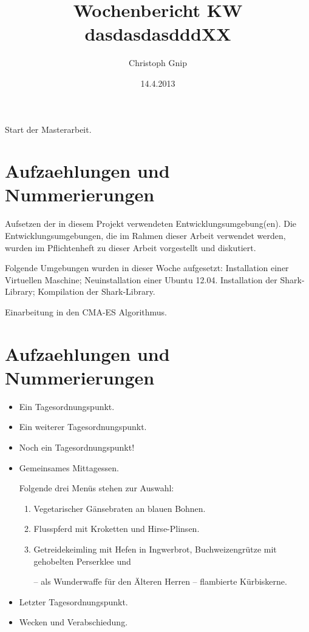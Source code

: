 ﻿\documentclass[a4paper,12pt,fleqn]{scrartcl}
\title{Wochenbericht KW dasdasdasdddXX}
\author{Christoph Gnip}
\date{14.4.2013}
\begin{document}
\maketitle

Start der Masterarbeit.

\section[Allgemeines]{Aufzaehlungen und Nummerierungen}

Aufsetzen der in diesem Projekt verwendeten Entwicklungsumgebung(en). Die
Entwicklungsumgebungen, die im Rahmen dieser Arbeit verwendet werden, wurden im
Pflichtenheft zu dieser Arbeit vorgestellt und diskutiert.

Folgende Umgebungen wurden in dieser Woche aufgesetzt:
Installation einer Virtuellen Maschine; Neuinstallation einer Ubuntu 12.04.
Installation  der Shark-Library;
Kompilation der Shark-Library.

Einarbeitung in den CMA-ES Algorithmus.


\section[Aufzhlungen]{Aufzaehlungen und Nummerierungen}
\begin{itemize}
  \item Ein Tagesordnungspunkt.
  \item Ein weiterer Tagesordnungspunkt.
  \item Noch ein Tagesordnungspunkt!
  \item Gemeinsames Mittagessen.%

    Folgende drei Menüs stehen zur Auswahl:
       \begin{enumerate}
        \item Vegetarischer Gänsebraten an blauen Bohnen.
        \item Flusspferd mit Kroketten und Hirse-Plinsen.
        \item Getreidekeimling mit Hefen in Ingwerbrot,
          Buchweizengrütze mit gehobelten Perserklee und

          -- als Wunderwaffe für den Älteren Herren --
          flambierte Kürbiskerne.
       \end{enumerate}
  \item Letzter Tagesordnungspunkt.
  \item Wecken und Verabschiedung.
\end{itemize}
\end{document}
